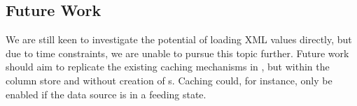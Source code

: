 \subsection{Future Work}
\label{sub:Future Work}
We are still keen to investigate the potential of loading XML values directly, but due to time constraints, we are unable to pursue this topic further. Future work should aim to replicate the existing caching mechanisms in \gap, but within the column store and without creation of s. Caching could, for instance, only be enabled if the data source is in a feeding state.
